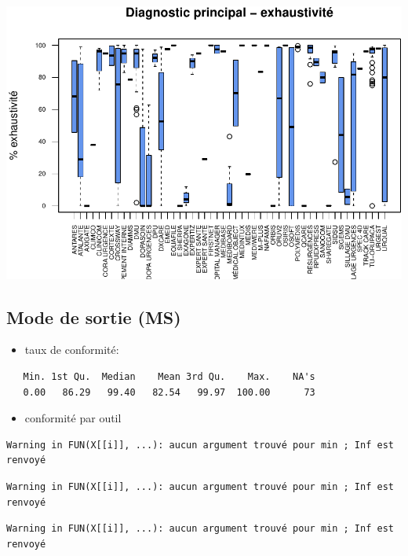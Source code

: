 \documentclass[]{article}
\begin{document}
\includegraphics{septembre2015_files/figure-latex/unnamed-chunk-20-1.pdf}

\subsection{Mode de sortie (MS)}\label{mode-de-sortie-ms}

\begin{itemize}
\itemsep1pt\parskip0pt
\item
  taux de conformité:
\end{itemize}

\begin{verbatim}
   Min. 1st Qu.  Median    Mean 3rd Qu.    Max.    NA's 
   0.00   86.29   99.40   82.54   99.97  100.00      73 
\end{verbatim}

\begin{itemize}
\itemsep1pt\parskip0pt
\item
  conformité par outil
\end{itemize}

\begin{verbatim}
Warning in FUN(X[[i]], ...): aucun argument trouvé pour min ; Inf est
renvoyé
\end{verbatim}

\begin{verbatim}
Warning in FUN(X[[i]], ...): aucun argument trouvé pour min ; Inf est
renvoyé
\end{verbatim}

\begin{verbatim}
Warning in FUN(X[[i]], ...): aucun argument trouvé pour min ; Inf est
renvoyé
\end{verbatim}
\end{document}
